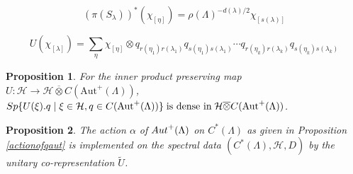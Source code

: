 \documentclass[10pt,a4paper]{amsart}
\newtheorem{proposition}{Proposition}
\newcommand{\cal}{\mathcal}
\newcommand{\clh}{{\cal H}}
\newcommand{\raro}{\rightarrow}
\begin{document}
\begin{equation}
\label{rep-2}
    (\pi(S_{\lambda}))^{\ast}(\chi_{[\eta]})=\rho(\Lambda)^{-d(\lambda)/2}\chi_{[s(\lambda)]}
\end{equation}

     \begin{equation}
\label{Uformula k lenghth path}
    U(\chi_{[\lambda]})=\sum_{\eta}\chi_{[\eta]}\otimes q_{r(\eta_{1})r(\lambda_{1})}q_{s(\eta_{1})s(\lambda_{1})}\cdots q_{r(\eta_{k})r(\lambda_{k})}q_{s(\eta_{k})s(\lambda_{k})}
\end{equation}

\begin{proposition}
\label{Udensity}
    For the inner product preserving map $U:\mathcal{H}\raro \mathcal{H} \overline{\otimes} C(\text{Aut}^{+}(\Lambda))$,
${\rm Sp}\{U(\xi).q\;|\; \xi\in \mathcal{H}, q\in C(\text{Aut}^{+}(\Lambda))\}\; \text{is dense in}\; \mathcal{H}\overline{\otimes} C(\text{Aut}^{+}(\Lambda))$.
\end{proposition}

\begin{proposition}
    \label{implementation}
    The action $\alpha$ of ${\rm Aut}^{+}(\Lambda)$ on $C^{\ast}(\Lambda)$ as given in Proposition \ref{actionofqaut} is implemented on the spectral data $(C^{\ast}(\Lambda),\clh,D)$ by the unitary co-representation $\widetilde{U}$.
\end{proposition}
\end{document}
